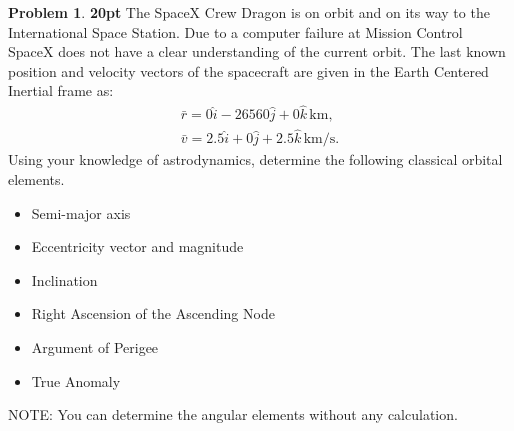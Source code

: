 \documentclass[10pt]{article}
\theoremstyle{definition}
\newtheorem{prob}{Problem}[section]
\begin{document}
\begin{prob}
    \textbf{20pt}
    The SpaceX Crew Dragon is on orbit and on its way to the International Space Station. 
    Due to a computer failure at Mission Control SpaceX does not have a clear understanding of the current orbit. 
    The last known position and velocity vectors of the spacecraft are given in the Earth Centered Inertial frame as:
    \begin{align*}
        \bar r = 0 \hat i - 26560 \hat j + 0 \hat k \, \si{\kilo\meter} ,\\
        \bar v = 2.5 \hat i + 0 \hat j + 2.5 \hat k \, \si{\kilo\meter\per\second}.
    \end{align*}
    Using your knowledge of astrodynamics, determine the following classical orbital elements.
    \begin{itemize}
        \item Semi-major axis
        \item Eccentricity vector and magnitude
        \item Inclination
        \item Right Ascension of the Ascending Node
        \item Argument of Perigee
        \item True Anomaly
    \end{itemize}
    NOTE: You can determine the angular elements without any calculation.
\end{prob}
\clearpage\newpage
\null\newpage
\null\newpage
\end{document}
